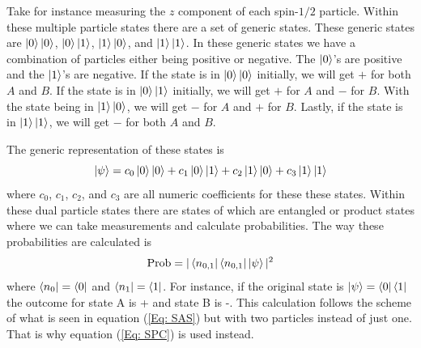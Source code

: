\documentclass[twocolumn]{article}
\begin{document}
Take for instance measuring the $z$ component of each spin-$1/2$ particle. Within these multiple particle states there are a set of generic states. These generic states are $\ket{0}\ket{0}$, $\ket{0}\ket{1}$, $\ket{1}\ket{0}$, and $\ket{1}\ket{1}$. In these generic states we have a combination of particles either being positive or negative. The $\ket{0}$'s are positive and the $\ket{1}$'s are negative. If the state is in $\ket{0}\ket{0}$ initially, we will get $+$ for both $A$ and $B$. If the state is in $\ket{0}\ket{1}$ initially, we will get $+$ for $A$ and $-$ for $B$. With the state being in $\ket{1}\ket{0}$, we will get $-$ for $A$ and $+$ for $B$. Lastly, if the state is in $\ket{1}\ket{1}$, we will get $-$ for both $A$ and $B$.

The generic representation of these states is
\begin{equation}\label{Eq: GSR}
\ket{\psi}=c_0\ket{0}\ket{0}+c_1\ket{0}\ket{1}+c_2\ket{1}\ket{0}+c_3\ket{1}\ket{1}
\end{equation}
where $c_0$, $c_1$, $c_2$, and $c_3$ are all numeric coefficients for these these states. Within these dual particle states there are states of which are entangled or product states where we can take measurements and calculate probabilities. The way these probabilities are calculated is
\begin{equation}\label{Eq: SPC}
\text{Prob}=|\bra{n_{0,1}}\bra{n_{0,1}}\ket{\psi}|^2
\end{equation}
where $\bra{n_0}=\bra{0}$ and $\bra{n_1}=\bra{1}$. For instance, if the original state is $\ket{\psi}=\bra{0}\bra{1}$ the outcome for state A is + and state B is -. This calculation follows the scheme of what is seen in equation (\ref{Eq: SAS}) but with two particles instead of just one. That is why equation (\ref{Eq: SPC}) is used instead.
\end{document}
